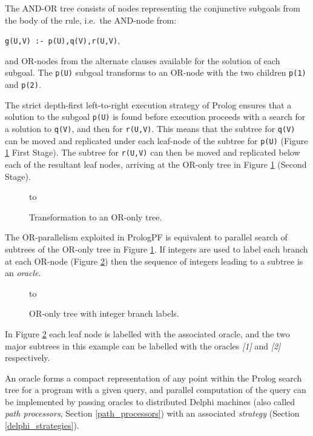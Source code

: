 The AND-OR tree consists of nodes representing the conjunctive subgoals from
the body of the rule, i.e.\ the AND-node from:\\
\centerline{\texttt{g(U,V) :- p(U),q(V),r(U,V)},}
and OR-nodes from the alternate clauses available for the solution of each
subgoal.  The \texttt{p(U)} subgoal transforms to an OR-node with the two
children \texttt{p(1)} and \texttt{p(2)}.

The strict depth-first left-to-right execution strategy of Prolog ensures that
a solution to the subgoal \texttt{p(U)} is found before execution proceeds with
a search for a solution to \texttt{q(V)}, and then for \texttt{r(U,V)}.
This means that the subtree for \texttt{q(V)} can be moved and replicated under
each leaf-node of the subtree for \texttt{p(U)}
(Figure \ref{or_only_tree} First Stage).
 The subtree for \texttt{r(U,V)}
can then be moved and replicated below each of the resultant leaf nodes, arriving
at the OR-only tree in Figure \ref{or_only_tree} (Second Stage).

\begin{figure}[htb]
\vspace{5mm} \hbox to 
\caption{Transformation to an OR-only tree.}
\vspace{5mm}
\label{or_only_tree}
\end{figure}

The OR-parallelism exploited in PrologPF is equivalent to parallel search
of subtrees of the OR-only tree in Figure \ref{or_only_tree}.  If integers are
used to label each branch at each OR-node (Figure \ref{oracle_tree}) then the
sequence of integers leading to a subtree is an \textit{oracle}.

\begin{figure}[htb]
\vspace{5mm} \hbox to 
\caption{OR-only tree with integer branch labels.}
\vspace{5mm}
\label{oracle_tree}
\end{figure}

In Figure \ref{oracle_tree} each leaf node is labelled with the associated oracle,
and the two major subtrees in this example can be labelled with the oracles
\textit{[1]} and \textit{[2]} respectively.

An oracle forms a compact representation of any point within the Prolog
search tree for a program with a given query, and parallel computation of the
query can be implemented by passing oracles to distributed Delphi machines
(also called \textit{path processors}, Section \ref{path_processors})
with an associated \textit{strategy} (Section \ref{delphi_strategies}).

